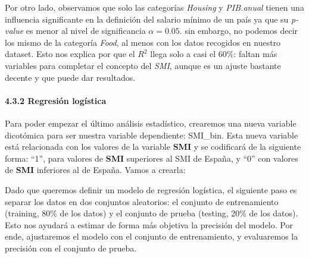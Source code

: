 \documentclass[
]{article}
\newenvironment{Shaded}{\begin{snugshade}}{\end{snugshade}}
\newcommand{\CommentTok}[1]{\textcolor[rgb]{0.56,0.35,0.01}{\textit{#1}}}
\newcommand{\DecValTok}[1]{\textcolor[rgb]{0.00,0.00,0.81}{#1}}
\newcommand{\FunctionTok}[1]{\textcolor[rgb]{0.13,0.29,0.53}{\textbf{#1}}}
\newcommand{\NormalTok}[1]{#1}
\newcommand{\OtherTok}[1]{\textcolor[rgb]{0.56,0.35,0.01}{#1}}
\newcommand{\SpecialCharTok}[1]{\textcolor[rgb]{0.81,0.36,0.00}{\textbf{#1}}}
\newcommand{\StringTok}[1]{\textcolor[rgb]{0.31,0.60,0.02}{#1}}
\begin{document}
Por otro lado, observamos que solo las categorías \emph{Housing} y
\emph{PIB.anual} tienen una influencia significante en la definición del
salario mínimo de un país ya que su \emph{p-value} es menor al nivel de
significancia \(\alpha=0.05\). sin embargo, no podemos decir los mismo
de la categoría \emph{Food}, al menos con los datos recogidos en nuestro
dataset. Esto nos explica por que el \(R^2\) llega solo a casi el 60\%:
faltan más variables para completar el concepto del \emph{SMI}, aunque
es un ajuste bastante decente y que puede dar resultados.

\hypertarget{regresiuxf3n-loguxedstica}{%
\paragraph{4.3.2 Regresión logística}\label{regresiuxf3n-loguxedstica}}

\hfill\break

Para poder empezar el último análisis estadístico, crearemos una nueva
variable dicotómica para ser nuestra variable dependiente: SMI\_bin.
Esta nueva variable está relacionada con los valores de la variable
\textbf{SMI} y se codificará de la siguiente forma: ``1'', para valores
de \textbf{SMI} superiores al SMI de España, y ``0'' con valores de
\textbf{SMI} inferiores al de España. Vamos a crearla:

\begin{Shaded}
\end{Shaded}

Dado que queremos definir un modelo de regresión logística, el siguiente
paso es separar los datos en dos conjuntos aleatorios: el conjunto de
entrenamiento (training, 80\% de los datos) y el conjunto de prueba
(testing, 20\% de los datos). Esto nos ayudará a estimar de forma más
objetiva la precisión del modelo. Por ende, ajustaremos el modelo con el
conjunto de entrenamiento, y evaluaremos la precisión con el conjunto de
prueba.
\end{document}
